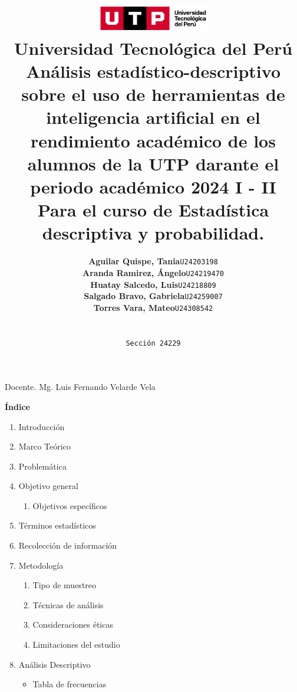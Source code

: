 \documentclass{article}
\title{
  \includegraphics[width=5cm]{./assets/logo-utp.png} \\
  \vspace{1cm}
  \textbf{Universidad Tecnológica del Perú} \\
  \vspace{2cm}
  \textbf{Análisis estadístico-descriptivo sobre el uso de herramientas de inteligencia artificial en el rendimiento académico de los alumnos de la UTP darante el periodo académico 2024 I - II} \\
  \vspace{1cm}
  \large \textbf{Para el curso de Estadística descriptiva y probabilidad.}
}
\author{
  \begin{tabular}{ll}
    \textbf{Aguilar Quispe, Tania} & \texttt{U24203198} \\
    \textbf{Aranda Ramirez, Ángelo} & \texttt{U24219470} \\
    \textbf{Huatay Salcedo, Luis} & \texttt{U24218809} \\
    \textbf{Salgado Bravo, Gabriela} & \texttt{U24259007} \\
    \textbf{Torres Vara, Mateo} & \texttt{U24308542} \\
  \end{tabular} \\\\
  \texttt{Sección 24229}
}
\newenvironment{indexPre}{}{}
\begin{document}
\maketitle

\begin{center}
  Docente. Mg. Luis Fernando Velarde Vela  
\end{center}

\restoregeometry

\newpage

\begin{indexPre}
  \begin{center}
    \textbf{\Large Índice}
  \end{center}
  \vspace{0.5cm} %
  
  \begin{spacing}{1.15} %
    \noindent
    \begin{enumerate}
      \item Introducción
      \item Marco Teórico
      \item Problemática
      \item Objetivo general
      \begin{enumerate}
        \item Objetivos específicos
      \end{enumerate}
      \item Términos estadísticos
      \item Recolección de información
      \item Metodología
      \begin{enumerate}
        \item Tipo de muestreo
        \item Técnicas de análisis
        \item Consideraciones éticas
        \item Limitaciones del estudio
      \end{enumerate}
      \item Análisis Descriptivo
      \begin{itemize}
        \item Tabla de frecuencias
      \end{itemize}
    \end{enumerate}
  \end{spacing}

\end{indexPre}
\end{document}
